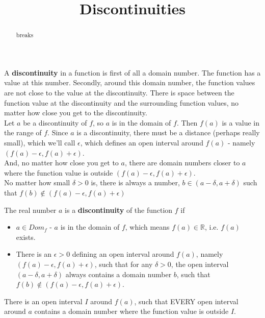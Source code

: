 \documentclass{ximera}
\title{Discontinuities}
\begin{document}
\begin{abstract}
breaks
\end{abstract}
\maketitle











A \textbf{discontinuity} in a function is first of all a domain number.  The function has a value at this number. Secondly, around this domain number, the function values are not close to the value at the discontinuity. There is space between the function value at the discontinuity and the surrounding function values, no matter how close you get to the discontinuity. \\












Let $a$ be a discontinuity of $f$, so $a$ is in the domain of $f$.   Then $f(a)$ is a value in the range of $f$. Since $a$ is a discontinuity, there must be a distance (perhaps really small), which we'll call $\epsilon$, which defines an open interval around $f(a)$ - namely $(f(a)-\epsilon, f(a)+\epsilon)$.  \\


And, no matter how close you get to $a$, there are domain numbers closer to $a$ where the function value is outside $(f(a)-\epsilon, f(a)+\epsilon)$. \\



No matter how small $\delta>0$ is, there is always a number, $b \in (a-\delta, a+\delta)$ such that $ f(b) \not\in(f(a)-\epsilon, f(a)+\epsilon)$ \\







\begin{definition}

The real number $a$ is a \textbf{discontinuity} of the function $f$ if


\begin{itemize}
\item $a \in Dom_f$ - $a$ is in the domain of $f$, which means $f(a) \in \mathbb{R}$, i.e. $f(a)$ exists.
\item There is an $\epsilon > 0$ defining an open interval around $f(a)$, namely $(f(a) - \epsilon, f(a) + \epsilon)$, such that for any $\delta > 0$, the open interval $(a - \delta, a + \delta)$ always contains a domain number $b$, such that $f(b) \not\in(f(a)-\epsilon, f(a)+\epsilon)$.
\end{itemize}


There is an open interval $I$ around $f(a)$, such that EVERY open interval around $a$ contains a domain number where the function value is outside $I$.


\end{definition}
\end{document}
